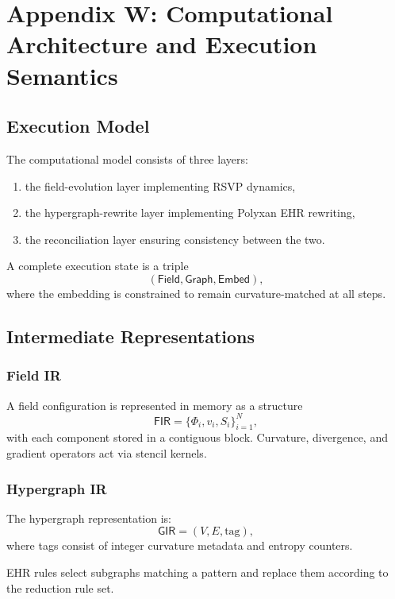 \chapter*{Appendix W: Computational Architecture and Execution Semantics}

\section{Execution Model}

The computational model consists of three layers:

\begin{enumerate}
\item the field-evolution layer implementing RSVP dynamics,
\item the hypergraph-rewrite layer implementing Polyxan EHR rewriting,
\item the reconciliation layer ensuring consistency between the two.
\end{enumerate}

A complete execution state is a triple
\[
(\mathsf{Field},\mathsf{Graph},\mathsf{Embed}),
\]
where the embedding is constrained to remain curvature-matched at all steps.

\section{Intermediate Representations}

\subsection{Field IR}

A field configuration is represented in memory as a structure
\[
\mathsf{FIR} = \{ \Phi_i, v_i, S_i \}_{i = 1}^N,
\]
with each component stored in a contiguous block.  
Curvature, divergence, and gradient operators act via stencil kernels.

\subsection{Hypergraph IR}

The hypergraph representation is:
\[
\mathsf{GIR} = (V,E,\mathrm{tag}),
\]
where tags consist of integer curvature metadata and entropy counters.

EHR rules select subgraphs matching a pattern and replace them according to the reduction rule set.

